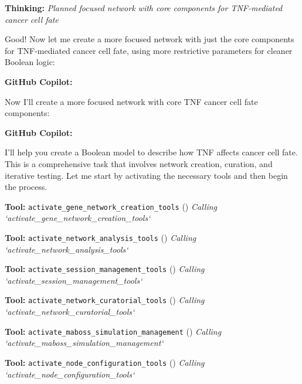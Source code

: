 \documentclass[11pt,a4paper]{article}
\begin{document}
\begin{thinkbox}
\textbf{Thinking:} \textit{Planned focused network with core components for TNF-mediated cancer cell fate}

Good! Now let me create a more focused network with just the core components for TNF-mediated cancer cell fate, using more restrictive parameters for cleaner Boolean logic:

\end{thinkbox}
\begin{copilotbox}
\textbf{GitHub Copilot:}

Now I'll create a more focused network with core TNF cancer cell fate components:

\end{copilotbox}
\begin{copilotbox}
\textbf{GitHub Copilot:}

I'll help you create a Boolean model to describe how TNF affects cancer cell fate. This is a comprehensive task that involves network creation, curation, and iterative testing. Let me start by activating the necessary tools and then begin the process.

\end{copilotbox}
\begin{toolokbox}
\textbf{Tool:} \texttt{activate\_gene\_network\_creation\_tools} (\checkmark)
\textit{Calling `activate\_gene\_network\_creation\_tools`}
\end{toolokbox}
\begin{toolokbox}
\textbf{Tool:} \texttt{activate\_network\_analysis\_tools} (\checkmark)
\textit{Calling `activate\_network\_analysis\_tools`}
\end{toolokbox}
\begin{toolokbox}
\textbf{Tool:} \texttt{activate\_session\_management\_tools} (\checkmark)
\textit{Calling `activate\_session\_management\_tools`}
\end{toolokbox}
\begin{toolokbox}
\textbf{Tool:} \texttt{activate\_network\_curatorial\_tools} (\checkmark)
\textit{Calling `activate\_network\_curatorial\_tools`}
\end{toolokbox}
\begin{toolokbox}
\textbf{Tool:} \texttt{activate\_maboss\_simulation\_management} (\checkmark)
\textit{Calling `activate\_maboss\_simulation\_management`}
\end{toolokbox}
\begin{toolokbox}
\textbf{Tool:} \texttt{activate\_node\_configuration\_tools} (\checkmark)
\textit{Calling `activate\_node\_configuration\_tools`}
\end{toolokbox}
\end{document}
